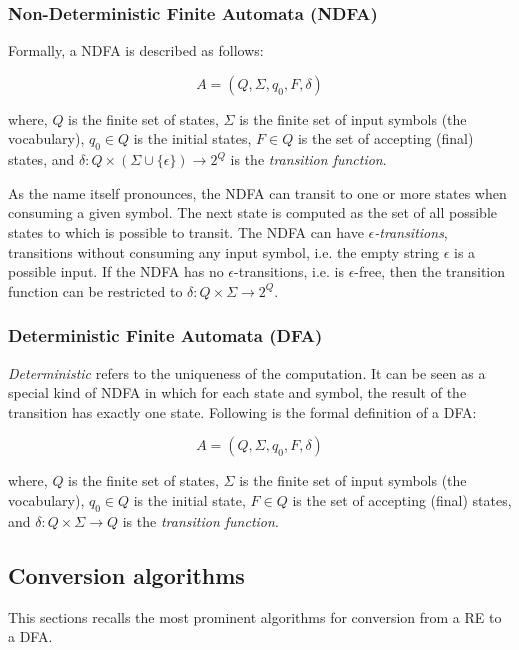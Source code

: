 \subsubsection{Non-Deterministic Finite Automata (NDFA)} Formally, a NDFA is described as follows:  

\begin{equation*}
    A = (Q,\Sigma,q_0,F,\delta)
\end{equation*}

where, $Q$ is the finite set of states, $\Sigma$ is the finite set of input symbols (the vocabulary), $q_0 \in Q$ is the initial states, $F \in Q$ is the set of accepting (final) states, and $\delta : Q \times (\Sigma \cup \{\epsilon\}) \rightarrow 2^Q$ is the \textit{transition function}. 

As the name itself pronounces, the NDFA can transit to one or more states when consuming a given symbol. The next state is computed as the set of all possible states to which is possible to transit. The NDFA can have \textit{$\epsilon$-transitions}, transitions without consuming any input symbol, i.e. the empty string $\epsilon$ is a possible input. 
If the NDFA has no $\epsilon$-transitions, i.e. is $\epsilon$-free, then the transition function can be restricted to $\delta : Q \times \Sigma \rightarrow 2^Q$.

\subsubsection{Deterministic Finite Automata (DFA)} \textit{Deterministic} refers to the uniqueness of the computation. It can be seen as a special kind of NDFA in which for each state and symbol, the result of the transition has exactly one state. Following is the formal definition of a DFA:

\begin{equation*}
    A = (Q,\Sigma,q_0,F,\delta)
\end{equation*}

where, $Q$ is the finite set of states, $\Sigma$ is the finite set of input symbols (the vocabulary), $q_0 \in Q$ is the initial state, $F \in Q$ is the set of accepting (final) states, and $\delta : Q \times \Sigma \rightarrow Q$ is the \textit{transition function}. 

\subsection{Conversion algorithms}
This sections recalls the most prominent algorithms for conversion from a RE to a DFA. 

